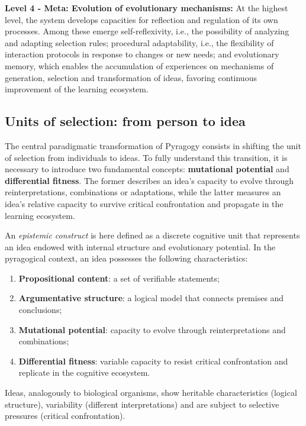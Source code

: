 \textbf{Level 4 - Meta: Evolution of evolutionary mechanisms:}
At the highest level, the system develops capacities for reflection and regulation of its own processes. Among these emerge self-reflexivity, i.e., the possibility of analyzing and adapting selection rules; procedural adaptability, i.e., the flexibility of interaction protocols in response to changes or new needs; and evolutionary memory, which enables the accumulation of experiences on mechanisms of generation, selection and transformation of ideas, favoring continuous improvement of the learning ecosystem.

\subsection{Units of selection: from person to idea}

The central paradigmatic transformation of Pyragogy consists in shifting the unit of selection from individuals to ideas. To fully understand this transition, it is necessary to introduce two fundamental concepts: \textbf{mutational potential} and \textbf{differential fitness}. The former describes an idea's capacity to evolve through reinterpretations, combinations or adaptations, while the latter measures an idea's relative capacity to survive critical confrontation and propagate in the learning ecosystem.

\begin{definition}
	\label{def:idea-unit}
	An \emph{epistemic construct} is here defined as a discrete cognitive unit that represents an idea endowed with internal structure and evolutionary potential. In the pyragogical context, an idea possesses the following characteristics:
	\begin{enumerate}
		\item \textbf{Propositional content}: a set of verifiable statements;
		\item \textbf{Argumentative structure}: a logical model that connects premises and conclusions;
		\item \textbf{Mutational potential}: capacity to evolve through reinterpretations and combinations;
		\item \textbf{Differential fitness}: variable capacity to resist critical confrontation and replicate in the cognitive ecosystem.
	\end{enumerate}
\end{definition}

Ideas, analogously to biological organisms, show heritable characteristics (logical structure), variability (different interpretations) and are subject to selective pressures (critical confrontation).

